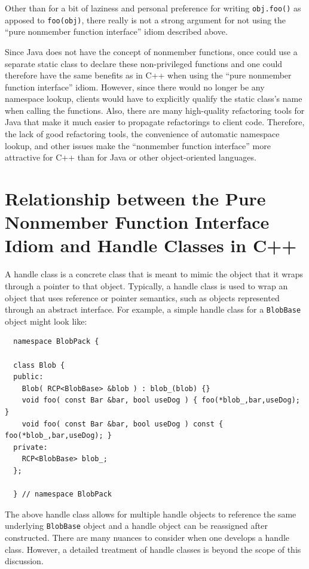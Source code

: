 \documentclass[pdf,ps2pdf,11pt]{SANDreport}
\begin{document}
Other than for a bit of laziness and personal preference for writing
{}\texttt{obj.foo()} as apposed to {}\texttt{foo(obj)}, there really is not a
strong argument for not using the ``pure nonmember function interface'' idiom
described above.

Since Java does not have the concept of nonmember functions, once could use a
separate static class to declare these non-privileged functions and one could
therefore have the same benefits as in C++ when using the ``pure nonmember
function interface'' idiom.  However, since there would no longer be any
namespace lookup, clients would have to explicitly qualify the static class's
name when calling the functions.  Also, there are many high-quality
refactoring tools for Java that make it much easier to propagate refactorings
to client code.  Therefore, the lack of good refactoring tools, the
convenience of automatic namespace lookup, and other issues make the
``nonmember function interface'' more attractive for C++ than for Java or
other object-oriented languages.

%
\section{Relationship between the Pure Nonmember Function Interface Idiom and Handle Classes in C++}
%

A handle class is a concrete class that is meant to mimic the object that it
wraps through a pointer to that object.  Typically, a handle class is used to
wrap an object that uses reference or pointer semantics, such as objects
represented through an abstract interface.  For example, a simple handle class
for a {}\texttt{BlobBase} object might look like:

{\small\begin{verbatim}
  namespace BlobPack {

  class Blob {
  public:
    Blob( RCP<BlobBase> &blob ) : blob_(blob) {}
    void foo( const Bar &bar, bool useDog ) { foo(*blob_,bar,useDog); }
    void foo( const Bar &bar, bool useDog ) const { foo(*blob_,bar,useDog); }
  private:
    RCP<BlobBase> blob_;
  };

  } // namespace BlobPack
\end{verbatim}}

The above handle class allows for multiple handle objects to reference the
same underlying {}\texttt{BlobBase} object and a handle object can be
reassigned after constructed.  There are many nuances to consider when one
develops a handle class.  However, a detailed treatment of handle classes is
beyond the scope of this discussion.
\end{document}
